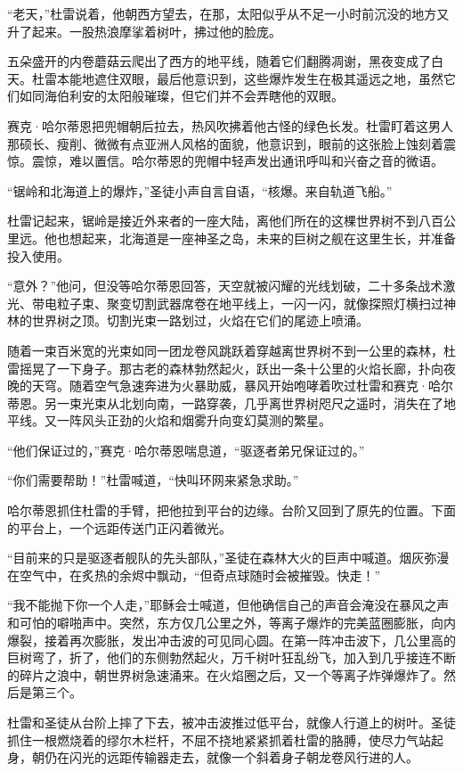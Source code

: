 \documentclass[AutoFakeBold=true]{book}
\begin{document}
``老天，''杜雷说着，他朝西方望去，在那，太阳似乎从不足一小时前沉没的地方又升了起来。一股热浪摩挲着树叶，拂过他的脸庞。

五朵盛开的内卷蘑菇云爬出了西方的地平线，随着它们翻腾凋谢，黑夜变成了白天。杜雷本能地遮住双眼，最后他意识到，这些爆炸发生在极其遥远之地，虽然它们如同海伯利安的太阳般璀璨，但它们并不会弄瞎他的双眼。

赛克·哈尔蒂恩把兜帽朝后拉去，热风吹拂着他古怪的绿色长发。杜雷盯着这男人那硕长、瘦削、微微有点亚洲人风格的面貌，他意识到，眼前的这张脸上蚀刻着震惊。震惊，难以置信。哈尔蒂恩的兜帽中轻声发出通讯呼叫和兴奋之音的微语。

``锯岭和北海道上的爆炸，''圣徒小声自言自语，``核爆。来自轨道飞船。''

杜雷记起来，锯岭是接近外来者的一座大陆，离他们所在的这棵世界树不到八百公里远。他也想起来，北海道是一座神圣之岛，未来的巨树之舰在这里生长，并准备投入使用。

``意外？''他问，但没等哈尔蒂恩回答，天空就被闪耀的光线划破，二十多条战术激光、带电粒子束、聚变切割武器席卷在地平线上，一闪一闪，就像探照灯横扫过神林的世界树之顶。切割光束一路划过，火焰在它们的尾迹上喷涌。

随着一束百米宽的光束如同一团龙卷风跳跃着穿越离世界树不到一公里的森林，杜雷摇晃了一下身子。那古老的森林勃然起火，跃出一条十公里的火焰长廊，扑向夜晚的天穹。随着空气急速奔进为火暴助威，暴风开始咆哮着吹过杜雷和赛克·哈尔蒂恩。另一束光束从北划向南，一路穿袭，几乎离世界树咫尺之遥时，消失在了地平线。又一阵风头正劲的火焰和烟雾升向变幻莫测的繁星。

``他们保证过的，''赛克·哈尔蒂恩喘息道，``驱逐者弟兄保证过的。''

``你们需要帮助！''杜雷喊道，``快叫环网来紧急求助。''

哈尔蒂恩抓住杜雷的手臂，把他拉到平台的边缘。台阶又回到了原先的位置。下面的平台上，一个远距传送门正闪着微光。

``目前来的只是驱逐者舰队的先头部队，''圣徒在森林大火的巨声中喊道。烟灰弥漫在空气中，在炙热的余烬中飘动，``但奇点球随时会被摧毁。快走！''

``我不能抛下你一个人走，''耶稣会士喊道，但他确信自己的声音会淹没在暴风之声和可怕的噼啪声中。突然，东方仅几公里之外，等离子爆炸的完美蓝圈膨胀，向内爆裂，接着再次膨胀，发出冲击波的可见同心圆。在第一阵冲击波下，几公里高的巨树弯了，折了，他们的东侧勃然起火，万千树叶狂乱纷飞，加入到几乎接连不断的碎片之浪中，朝世界树急速涌来。在火焰圈之后，又一个等离子炸弹爆炸了。然后是第三个。

杜雷和圣徒从台阶上摔了下去，被冲击波推过低平台，就像人行道上的树叶。圣徒抓住一根燃烧着的缪尔木栏杆，不屈不挠地紧紧抓着杜雷的胳膊，使尽力气站起身，朝仍在闪光的远距传输器走去，就像一个斜着身子朝龙卷风行进的人。
\end{document}
